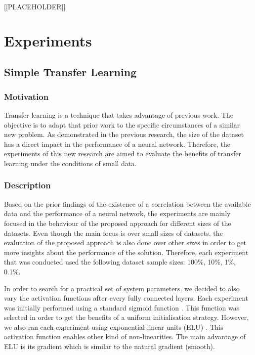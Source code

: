 \documentclass{article}
\begin{document}
[[PLACEHOLDER]]

\section{Experiments}
\label{sec:experiments}

\subsection{Simple Transfer Learning}

\subsubsection{\textbf{Motivation}}

Transfer learning is a technique that takes advantage of previous work. The objective is to adapt that prior work to the specific circumstances of a similar new problem. As demonstrated in the previous research, the size of the dataset has a direct impact in the performance of a neural network. Therefore, the experiments of this new research are aimed to evaluate the benefits of transfer learning under the conditions of small data.

\subsubsection{\textbf{Description}}

Based on the prior findings of the existence of a correlation between the available data and the performance of a neural network, the experiments are mainly focused in the behaviour of the proposed approach for different sizes of the datasets. Even though the main focus is over small sizes of datasets, the evaluation of the proposed approach is also done over other sizes in order to get more insights about the performance of the solution. Therefore, each experiment that was conducted used the following dataset sample sizes: 100\%, 10\%, 1\%, 0.1\%.

In order to search for a practical set of system parameters, we decided to also vary the activation functions after every fully connected layers. Each experiment was initially performed using a standard sigmoid function \cite{hecht1992theory}. This function was selected in order to get the benefits of a uniform initialisation strategy. However, we also ran each experiment using exponential linear units (ELU) \cite{clevert2015fast}. This activation function enables other kind of non-linearities. The main advantage of ELU is its gradient which is similar to the natural gradient (smooth).
\end{document}
